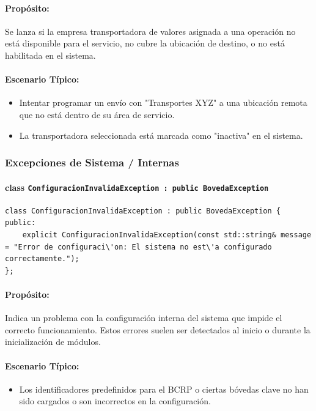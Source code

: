 \documentclass{article}
\newcommand{\inlinecode}[1]{\texttt{#1}}
\begin{document}
\paragraph*{Propósito:} Se lanza si la empresa transportadora de valores asignada a una operación no está disponible para el servicio, no cubre la ubicación de destino, o no está habilitada en el sistema.

\paragraph*{Escenario Típico:}
\begin{itemize}
    \item Intentar programar un envío con "Transportes XYZ" a una ubicación remota que no está dentro de su área de servicio.
    \item La transportadora seleccionada está marcada como "inactiva" en el sistema.
\end{itemize}

\subsubsection*{Excepciones de Sistema / Internas}

\paragraph*{\textbf{class \inlinecode{ConfiguracionInvalidaException : public BovedaException}}}
\begin{lstlisting}
class ConfiguracionInvalidaException : public BovedaException {
public:
    explicit ConfiguracionInvalidaException(const std::string& message = "Error de configuraci\'on: El sistema no est\'a configurado correctamente.");
};
\end{lstlisting}
\paragraph*{Propósito:} Indica un problema con la configuración interna del sistema que impide el correcto funcionamiento. Estos errores suelen ser detectados al inicio o durante la inicialización de módulos.

\paragraph*{Escenario Típico:}
\begin{itemize}
    \item Los identificadores predefinidos para el BCRP o ciertas bóvedas clave no han sido cargados o son incorrectos en la configuración.
\end{itemize}
\end{document}
